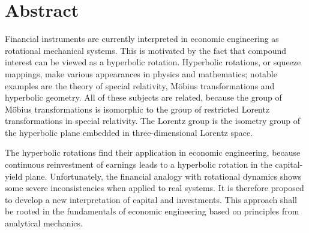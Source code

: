 \chapter*{Abstract}%
Financial instruments are currently interpreted in economic engineering as rotational mechanical systems. This is motivated by the fact that compound interest can be viewed as a hyperbolic rotation. Hyperbolic rotations, or squeeze mappings, make various appearances in physics and mathematics; notable examples are the theory of special relativity, Möbius transformations and hyperbolic geometry. All of these subjects are related, because the group of Möbius transformations is isomorphic to the group of restricted Lorentz transformations in special relativity. The Lorentz group is the isometry group of the hyperbolic plane embedded in three-dimensional Lorentz space. 

The hyperbolic rotations find their application in economic engineering, because continuous reinvestment of earnings leads to a hyperbolic rotation in the capital-yield plane. Unfortunately, the financial analogy with rotational dynamics shows some severe inconsistencies when applied to real systems. It is therefore proposed to develop a new interpretation of capital and investments. This approach shall be rooted in the fundamentals of economic engineering based on principles from analytical mechanics.




